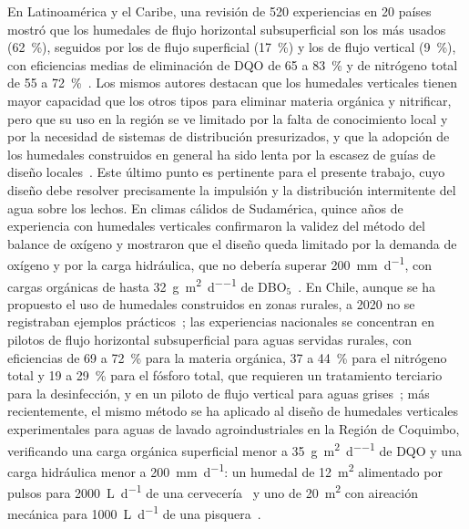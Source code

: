 En Latinoamérica y el Caribe, una revisión de 520 experiencias en 20 países mostró que los humedales de flujo horizontal subsuperficial son los más usados (\qty{62}{\percent}), seguidos por los de flujo superficial (\qty{17}{\percent}) y los de flujo vertical (\qty{9}{\percent}), con eficiencias medias de eliminación de DQO de 65 a \qty{83}{\percent} y de nitrógeno total de 55 a \qty{72}{\percent}~\parencite{rodriguezdominguez2020constructed}.
Los mismos autores destacan que los humedales verticales tienen mayor capacidad que los otros tipos para eliminar materia orgánica y nitrificar, pero que su uso en la región se ve limitado por la falta de conocimiento local y por la necesidad de sistemas de distribución presurizados, y que la adopción de los humedales construidos en general ha sido lenta por la escasez de guías de diseño locales~\parencite{rodriguezdominguez2020constructed}.
Este último punto es pertinente para el presente trabajo, cuyo diseño debe resolver precisamente la impulsión y la distribución intermitente del agua sobre los lechos.
En climas cálidos de Sudamérica, quince años de experiencia con humedales verticales confirmaron la validez del método del balance de oxígeno y mostraron que el diseño queda limitado por la demanda de oxígeno y por la carga hidráulica, que no debería superar \qty{200}{\milli\meter\per\day}, con cargas orgánicas de hasta \qty{32}{\gram\per\square\meter\per\day} de DBO$_5$~\parencite{platzer2016long}.
En Chile, aunque se ha propuesto el uso de humedales construidos en zonas rurales, a 2020 no se registraban ejemplos prácticos~\parencite{altafin2020innovaciones}; las experiencias nacionales se concentran en pilotos de flujo horizontal subsuperficial para aguas servidas rurales, con eficiencias de 69 a \qty{72}{\percent} para la materia orgánica, 37 a \qty{44}{\percent} para el nitrógeno total y 19 a \qty{29}{\percent} para el fósforo total, que requieren un tratamiento terciario para la desinfección, y en un piloto de flujo vertical para aguas grises~\parencite{vidal2023desarrollo}; más recientemente, el mismo método se ha aplicado al diseño de humedales verticales experimentales para aguas de lavado agroindustriales en la Región de Coquimbo, verificando una carga orgánica superficial menor a \qty{35}{\gram\per\square\meter\per\day} de DQO y una carga hidráulica menor a \qty{200}{\milli\meter\per\day}: un humedal de \qty{12}{\square\meter} alimentado por pulsos para \qty{2000}{\liter\per\day} de una cervecería~\parencite{vera2025atrapaniebla} y uno de \qty{20}{\square\meter} con aireación mecánica para \qty{1000}{\liter\per\day} de una pisquera~\parencite{vera2025nichos}.

